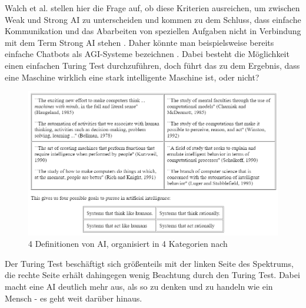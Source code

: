             Walch et al. stellen hier die Frage auf, ob diese Kriterien ausreichen, um zwischen Weak und Strong AI
            zu unterscheiden und kommen zu dem Schluss, dass einfache Kommunikation und das Abarbeiten von
            speziellen Aufgaben nicht in Verbindung mit dem Term Strong AI stehen \citeyearpar{walch_world_2019}.
            Daher könnte man beispielsweise bereits einfache Chatbots als AGI-Systeme bezeichnen \cite{walch_world_2019}.
            Dabei besteht die Möglichkeit einen einfachen Turing Test durchzuführen, doch führt das zu dem Ergebnis,
            dass eine Maschine wirklich eine stark intelligente Maschine ist, oder nicht?
            \begin{figure}[h]
                \begin{center}
                    \includegraphics[width=1.0\textwidth]{figures/ai-definitions.png}
                    \caption[4 Definitionen AI]{4 Definitionen von AI, organisiert in 4 Kategorien nach \cite{russell}}
                    \label{pic:ai-definitions}
                \end{center}
            \end{figure}
            Der Turing Test beschäftigt sich größenteils mit der linken Seite des Spektrums, die rechte Seite erhält
            dahingegen wenig Beachtung durch den Turing Test. Dabei macht eine AI deutlich mehr aus, als so zu denken
            und zu handeln wie ein Mensch - es geht weit darüber hinaus.


